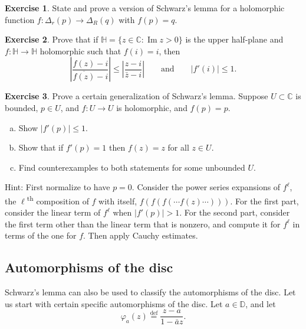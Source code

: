 \documentclass[12pt,openany]{book}
\renewcommand{\Im}{\operatorname{Im}}
\newcommand{\abs}[1]{\left\lvert {#1} \right\rvert}
\newcommand{\C}{{\mathbb{C}}}
\newcommand{\D}{{\mathbb{D}}}
\newcommand{\bH}{{\mathbb{H}}}
\theoremstyle{plain}
\theoremstyle{remark}
\theoremstyle{definition}
\newenvironment{exbox}{%
    \def\FrameCommand{\vrule width 1pt \relax\hspace {10pt}}%
    \MakeFramed {\advance \hsize -\width \FrameRestore }%
}{%
    \endMakeFramed
}
\newenvironment{exparts}{%
    \leavevmode\begin{enumerate}[a),noitemsep,topsep=0pt,parsep=0pt,partopsep=0pt]
}{%
    \end{enumerate}
}
\theoremstyle{exercise}
\newtheorem{exercise}{Exercise}[section]
\theoremstyle{example}
\begin{document}
\begin{exbox}
\begin{exercise}
State and prove a version of Schwarz's lemma for a holomorphic
function $f \colon \Delta_r(p) \to \Delta_R(q)$ with $f(p)=q$.
\end{exercise}

\begin{exercise}
Prove that if $\bH = \{ z \in \C : \Im z > 0 \}$ is the upper half-plane
and $f \colon \bH \to \bH$ holomorphic such that $f(i) = i$, then
\begin{equation*}
\abs{\frac{f(z)-i}{\overline{f(z)}-i}} \leq
\abs{\frac{z-i}{\bar{z}-i}} 
\qquad
\text{and}
\qquad
\abs{f'(i)} \leq 1 .
\end{equation*}
\end{exercise}

\begin{exercise}
Prove a certain generalization of Schwarz's lemma.  Suppose $U \subset \C$
is bounded, $p \in U$, and $f \colon U \to U$ is holomorphic, and $f(p)=p$.
\begin{exparts}
\item
Show $\abs{f'(p)} \leq 1$.
\item
Show that if $f'(p) = 1$ then $f(z) = z$ for all $z \in U$.
\item
Find counterexamples to both statements for some unbounded $U$.
\end{exparts}
Hint: First normalize to have $p=0$.  Consider the power series
expansions of
$f^{\ell}$, the $\ell$\textsuperscript{th} composition of $f$ with itself,
$f(f(f(\cdots f(z) \cdots)))$.
For the first part, consider the linear term of $f^{\ell}$ when $\abs{f'(p)}
> 1$.  For the second part,
consider the first term other
than the linear term that is nonzero, and compute it for $f^{\ell}$ in terms
of the one for $f$.  Then apply Cauchy estimates.
\end{exercise}
\end{exbox}

\subsection{Automorphisms of the disc}

Schwarz's lemma can also be used to classify the automorphisms of the disc.
Let us start with certain specific automorphisms of the disc.
Let $a \in \D$, and let
\begin{equation*}
\varphi_a(z) \overset{\text{def}}{=} \frac{z-a}{1-\bar{a}z}.
\end{equation*}
\end{document}
